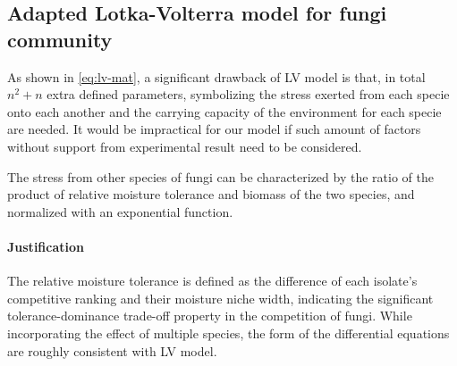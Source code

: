 



\subsection{Adapted Lotka-Volterra model for fungi community}

As shown in \eqref{eq:lv-mat}, a significant drawback of LV model is that, in total $n^2 + n$ extra defined parameters, symbolizing the stress exerted from each specie onto each another and the carrying capacity of the environment for each specie are needed. It would be impractical for our model if such amount of factors without support from experimental result need to be considered.

\begin{definition}
    The stress from other species of fungi can be characterized by the ratio of the product of relative moisture tolerance and biomass of the two species, and normalized with an exponential function.
\end{definition}
\paragraph*{Justification} The relative moisture tolerance is defined as the difference of each isolate’s competitive ranking and their moisture niche width, indicating the significant tolerance-dominance trade-off property in the competition of fungi. While incorporating the effect of multiple species, the form of the differential equations are roughly consistent with LV model.

